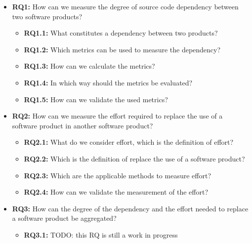 \begin{itemize}
    \item \textbf{RQ1:} How can we measure the degree of source code dependency between two software products?

    \begin{itemize}
      \item \textbf{RQ1.1:} What constitutes a dependency between two products?
      \item \textbf{RQ1.2:} Which metrics can be used to measure the dependency?
      \item \textbf{RQ1.3:} How can we calculate the metrics?
      \item \textbf{RQ1.4:} In which way should the metrics be evaluated?
      \item \textbf{RQ1.5:} How can we validate the used metrics?
    \end{itemize}

    \item \textbf{RQ2:} How can we measure the effort required to replace the use of a software product in another software product?

    \begin{itemize}
      \item \textbf{RQ2.1:} What do we consider effort, which is the definition of effort?
      \item \textbf{RQ2.2:} Which is the definition of replace the use of a software product?
      \item \textbf{RQ2.3:} Which are the applicable methods to measure effort?
      \item \textbf{RQ2.4:} How can we validate the measurement of the effort?
    \end{itemize}

    \item \textbf{RQ3:} How can the degree of the dependency and the effort needed to replace a software product be aggregated?
    \begin{itemize}
      \item \textbf{RQ3.1:} TODO: this RQ is still a work in progress
    \end{itemize}
\end{itemize}
